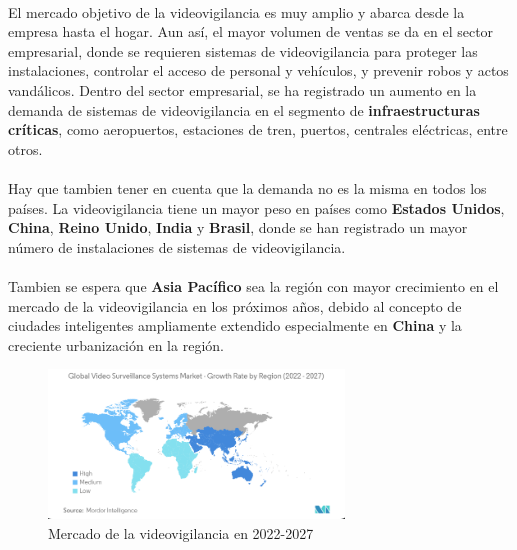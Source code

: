 \documentclass{report}
\begin{document}
        \paragraph*{}
        {
          El mercado objetivo de la videovigilancia es muy amplio y abarca desde la empresa hasta el hogar. 
          Aun así, el mayor volumen de ventas se da en el sector empresarial, donde se requieren sistemas de videovigilancia para proteger las instalaciones, controlar el acceso de personal y vehículos, y prevenir robos y actos vandálicos.
          Dentro del sector empresarial, se ha registrado un aumento en la demanda de sistemas de videovigilancia en el segmento de \textbf{infraestructuras críticas}, como aeropuertos, estaciones de tren, puertos, centrales eléctricas, entre otros.\cite{mordor-video-surveillance}
        }
        \paragraph*{}
        {
          Hay que tambien tener en cuenta que la demanda no es la misma en todos los países. La videovigilancia tiene un mayor peso en países como \textbf{Estados Unidos}, \textbf{China}, \textbf{Reino Unido}, \textbf{India} y \textbf{Brasil}, donde se han registrado un mayor número de instalaciones de sistemas de videovigilancia.\cite{mordor-video-surveillance}
        }
        \paragraph*{}
        {
          Tambien se espera que \textbf{Asia Pacífico} sea la región con mayor crecimiento en el mercado de la videovigilancia en los próximos años, debido al concepto de ciudades inteligentes ampliamente extendido especialmente en \textbf{China} y la creciente urbanización en la región.\cite{mordor-video-surveillance}
        }
        \begin{figure}[H]
          \centering
          \includegraphics[width=0.7\textwidth]{./img/ssm.png}
          \caption{Mercado de la videovigilancia en 2022-2027}
        \end{figure}   
\end{document}
